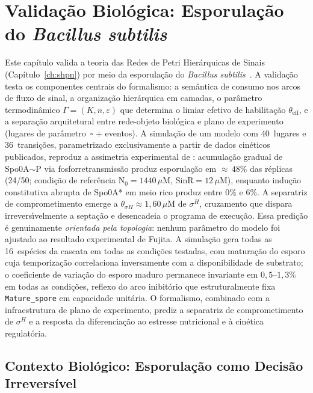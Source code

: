\chapter{Validação Biológica: Esporulação do \textit{Bacillus subtilis}}
\label{ch:validacao-bacillus}

Este capítulo valida a teoria das Redes de Petri Hierárquicas de Sinais
(Capítulo~\ref{ch:shpn}) por meio da esporulação do
\textit{Bacillus subtilis}~\cite{Fujita2005}.
A validação testa os componentes centrais do formalismo: a semântica de consumo
nos arcos de fluxo de sinal, a organização hierárquica em camadas, o
parâmetro termodinâmico $\Gamma = (K, n, \varepsilon)$ que determina o limiar
efetivo de habilitação $\theta_{\text{eff}}$, e a separação arquitetural
entre rede-objeto biológica e plano de experimento (lugares de
parâmetro~$\square$ + eventos).
A simulação de um modelo com 40~lugares e 36~transições, parametrizado
exclusivamente a partir de dados cinéticos publicados, reproduz a assimetria
experimental de \textcite{Fujita2005}: acumulação gradual de Spo0A${\sim}$P
via fosforretransmissão produz esporulação em ${\approx}\,48\%$ das réplicas
(24/50; condição de referência $\text{N}_0 = 1440\,\mu$M, SinR$= 12\,\mu$M),
enquanto indução constitutiva abrupta de Spo0A* em meio rico produz entre
$0\%$ e $6\%$. A separatriz de comprometimento emerge a
$\theta_{\sigma H} \approx 1{,}60\,\mu$M de $\sigma^H$, cruzamento que dispara
irrevers\'{\i}velmente a septação e desencadeia o programa de execução.
Essa predição é genuinamente \textit{orientada pela topologia}: nenhum parâmetro do modelo
foi ajustado ao resultado experimental de Fujita.
A simulação gera todas as 16~espécies da cascata em todas as condições
testadas, com maturação do esporo cuja temporização correlaciona inversamente
com a disponibilidade de substrato; o coeficiente de variação do esporo
maduro permanece invariante em $0{,}5$--$1{,}3\%$ em todas as condições,
reflexo do arco inibitório que estruturalmente fixa \texttt{Mature\_spore}
em capacidade unitária.
O formalismo, combinado com a infraestrutura de plano de experimento,
prediz a separatriz de comprometimento de $\sigma^H$ e a resposta
da diferenciação ao estresse nutricional e à cinética regulatória.

\section{Contexto Biológico: Esporulação como Decisão Irreversível}
\label{sec:contexto-biologico}

